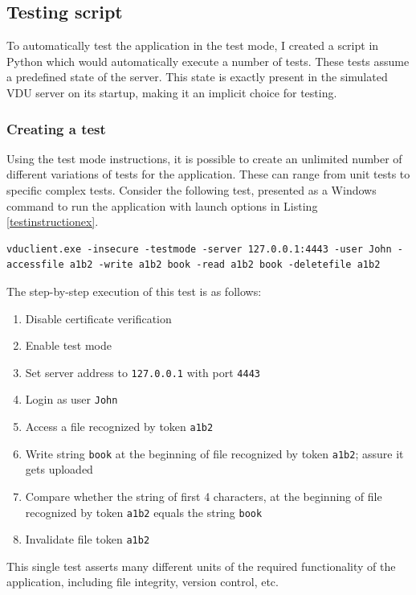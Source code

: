 \subsection{Testing script}
To automatically test the application in the test mode, I created a script in Python which would automatically execute a number of tests. These tests assume a predefined state of the server. This state is exactly present in the simulated VDU server on its startup, making it an implicit choice for testing.

\subsubsection{Creating a test}
Using the test mode instructions, it is possible to create an unlimited number of different variations of tests for the application. These can range from unit tests to specific complex tests. Consider the following test, presented as a Windows command to run the application with launch options in Listing \ref{testinstructionex}.
\begin{lstlisting}[caption={An example command with launch options to test the VDU Client application.}, label=testinstructionex]
vduclient.exe -insecure -testmode -server 127.0.0.1:4443 -user John -accessfile a1b2 -write a1b2 book -read a1b2 book -deletefile a1b2
\end{lstlisting}
The step-by-step execution of this test is as follows:
\begin{enumerate}
    \item Disable certificate verification
    \item Enable test mode
    \item Set server address to \lstinline{127.0.0.1} with port \lstinline{4443}
    \item Login as user \lstinline{John}
    \item Access a file recognized by token \lstinline{a1b2}
    \item Write string \lstinline{book} at the beginning of file recognized by token \lstinline{a1b2}; assure it gets uploaded
    \item Compare whether the string of first 4 characters, at the beginning of file recognized by token \lstinline{a1b2} equals the string \lstinline{book}
    \item Invalidate file token \lstinline{a1b2}
\end{enumerate}
This single test asserts many different units of the required functionality of the application, including file integrity, version control, etc.

